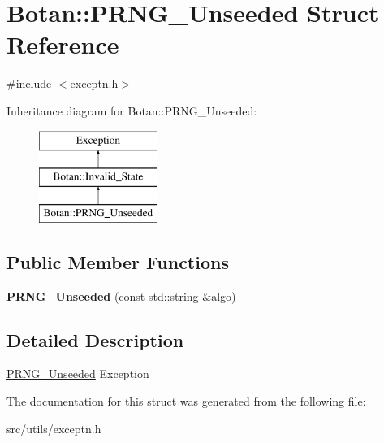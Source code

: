 \hypertarget{structBotan_1_1PRNG__Unseeded}{\section{Botan\-:\-:P\-R\-N\-G\-\_\-\-Unseeded Struct Reference}
\label{structBotan_1_1PRNG__Unseeded}
}


{\ttfamily \#include $<$exceptn.\-h$>$}

Inheritance diagram for Botan\-:\-:P\-R\-N\-G\-\_\-\-Unseeded\-:\begin{figure}[H]
\begin{center}
\leavevmode
\includegraphics[height=3.000000cm]{structBotan_1_1PRNG__Unseeded}
\end{center}
\end{figure}
\subsection*{Public Member Functions}
\begin{DoxyCompactItemize}
\item 
\hypertarget{structBotan_1_1PRNG__Unseeded_ad265d64515ed2c6d060ce9e8148c7a50}{{\bfseries P\-R\-N\-G\-\_\-\-Unseeded} (const std\-::string \&algo)}\label{structBotan_1_1PRNG__Unseeded_ad265d64515ed2c6d060ce9e8148c7a50}

\end{DoxyCompactItemize}


\subsection{Detailed Description}
\hyperlink{structBotan_1_1PRNG__Unseeded}{P\-R\-N\-G\-\_\-\-Unseeded} Exception 

The documentation for this struct was generated from the following file\-:\begin{DoxyCompactItemize}
\item 
src/utils/exceptn.\-h\end{DoxyCompactItemize}
